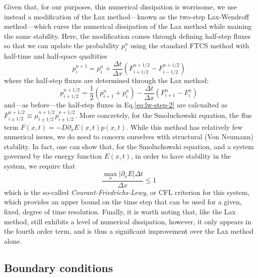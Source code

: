 \documentclass[15pt]{article}
\begin{document}
Given that, for our purposes, this numerical dissipation is worrisome, we use instead a modification of the Lax method---known as the two-step Lax-Wendroff method---which cures the numerical dissipation of the Lax method while maining the same stability. Here, the modification comes through defining half-step fluxes so that we can update the probability $p_i^n$ using the standard FTCS method with half-time and half-space qualtities
\begin{equation}
    p_i^{n+1} = p_i^n + \frac{\Delta t}{\Delta x}\left( F_{i+1/2}^{n+1/2} - F_{i-1/2}^{n+1/2} \right) \label{eq:lw-step-2}
\end{equation}
where the half-step fluxes are determined through the Lax method:
\begin{equation}
    p_{i+1/2}^{n+1/2} = \frac{1}{2}\left( p_{i+1}^n + p_{i}^n \right) - \frac{\Delta t}{\Delta x}\left( F_{i+1}^n - F_i^n \right) \label{eq:lw-step-1}
\end{equation}
and---as before---the half-step fluxes in Eq.\eqref{eq:lw-step-2} are calcualted as $F_{i\pm1/2}^{n+1/2} \equiv \mu_{i\pm1/2}^{n+1/2}p_{i\pm1/2}^{n+1/2}$. More concretely, for the Smoluchowski equation, the flus term $F(x, t) = -D\partial_x E(x, t)p(x, t)$. While this method has relatively few numerical issues, we do need to concern ourselves with structural (Von Neumann) stability. In fact, one can show that, for the Smoluchowski equation, and a system governed by the energy function $E(x, t)$, in order to have stability in the system, we require that
\begin{equation}
    \frac{\max_x |\partial_x E | \Delta t}{\Delta x} \leq 1 \label{eq:cfl}
\end{equation}
which is the so-called \emph{Courant-Friedrichs-Lewy}, or CFL criterion for this system, which provides an upper bound on the time step that can be used for a given, fixed, degree of time resolution.  Finally, it is worth noting that, like the Lax method, still exhibits a level of numerical dissipation, however, it only appears in the fourth order term, and is thus a significant improvement over the Lax method alone.

\subsection{Boundary conditions}
\end{document}
